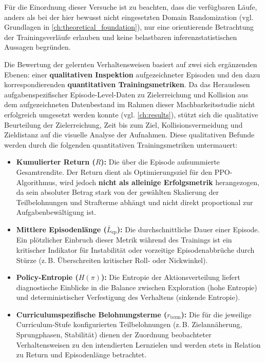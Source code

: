 Für die Einordnung dieser Versuche ist zu beachten, dass die verfügbaren Läufe, anders als bei der hier bewusst nicht eingesetzten Domain Randomization (vgl. Grundlagen in \autoref{ch:theoretical_foundation}), nur eine orientierende Betrachtung der Trainingsverläufe erlauben und keine belastbaren inferenzstatistischen Aussagen begründen.

Die Bewertung der gelernten Verhaltensweisen basiert auf zwei sich ergänzenden Ebenen: einer \textbf{qualitativen Inspektion} aufgezeichneter Episoden und den dazu korrespondierenden \textbf{quantitativen Trainingsmetriken}. Da das Herauslesen aufgabenspezifischer Episode-Level-Daten zu Zielerreichung und Kollision aus dem aufgezeichneten Datenbestand im Rahmen dieser Machbarkeitsstudie nicht erfolgreich umgesetzt werden konnte (vgl. \autoref{ch:results}), stützt sich die qualitative Beurteilung der Zielerreichung, Zeit bis zum Ziel, Kollisionsvermeidung und Zieldistanz auf die visuelle Analyse der Aufnahmen. Diese qualitativen Befunde werden durch die folgenden quantitativen Trainingsmetriken untermauert:
\begin{itemize}
	\item \textbf{Kumulierter Return ($R$):} Die über die Episode aufsummierte Gesamtrendite. Der Return dient als Optimierungsziel für den PPO-Algorithmus, wird jedoch \textbf{nicht als alleinige Erfolgsmetrik} herangezogen, da sein absoluter Betrag stark von der gewählten Skalierung der Teilbelohnungen und Strafterme abhängt und nicht direkt proportional zur Aufgabenbewältigung ist.
	\item \textbf{Mittlere Episodenlänge ($\bar{L}_{\text{ep}}$):} Die durchschnittliche Dauer einer Episode. Ein plötzlicher Einbruch dieser Metrik während des Trainings ist ein kritischer Indikator für Instabilität oder vorzeitige Episodenabbrüche durch Stürze (z.\,B. Überschreiten kritischer Roll- oder Nickwinkel).
	\item \textbf{Policy-Entropie ($H(\pi)$):} Die Entropie der Aktionsverteilung liefert diagnostische Einblicke in die Balance zwischen Exploration (hohe Entropie) und deterministischer Verfestigung des Verhaltens (sinkende Entropie).
	\item \textbf{Curriculumspezifische Belohnungsterme ($r_{\text{term}}$):} Die für die jeweilige Curriculum-Stufe konfigurierten Teilbelohnungen (z.\,B. Zielannäherung, Sprungphasen, Stabilität) dienen der Zuordnung beobachteter Verhaltensweisen zu den intendierten Lernzielen und werden stets in Relation zu Return und Episodenlänge betrachtet.
\end{itemize}

